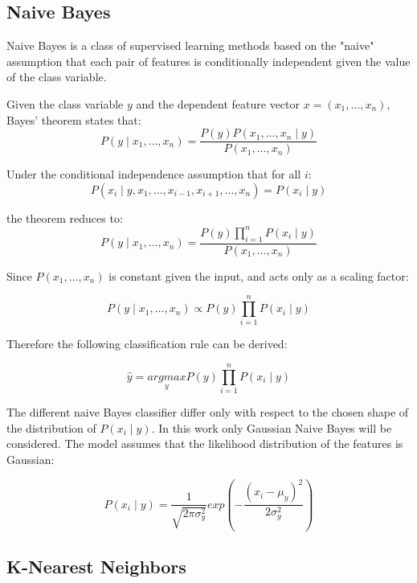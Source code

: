 \documentclass[journal,twocolumn]{IEEEtran}
\begin{document}
\subsection{Naive Bayes}

Naive Bayes is a class of supervised learning methods based on the "naive" assumption that each pair of features is conditionally independent given the value of the class variable.

Given the class variable $y$ and the dependent feature vector $x=(x_1,\dots,x_n)$, Bayes' theorem states that:
\begin{equation}
P(y\mid x_1,\dots, x_n)=\frac{P(y)P(x_1,\dots,x_n\mid y)}{P(x_1,\dots,x_n)}
\end{equation}

Under the conditional independence assumption that for all $i$:
\begin{equation*}
P(x_i\mid y,x_1,\dots,x_{i-1},x_{i+1},\dots, x_n)=P(x_i\mid y)
\end{equation*}

the theorem reduces to:
\begin{equation*}
P(y\mid x_1,\dots, x_n)=\frac{P(y)\prod\limits_{i=1}^nP(x_i\mid y)}{P(x_1,\dots,x_n)}
\end{equation*}

Since $P(x_1,\dots,x_n)$ is constant given the input, and acts only as a scaling factor:

\begin{equation*}
P(y\mid x_1,\dots, x_n)\propto P(y)\prod\limits_{i=1}^nP(x_i\mid y)
\end{equation*}

Therefore the following classification rule can be derived:

\begin{equation*}
\hat y = \underset{y}{argmax}P(y)\prod\limits_{i=1}^nP(x_i\mid y)
\end{equation*}

The different naive Bayes classifier differ only with respect to the chosen shape of the distribution of $P(x_i\mid y)$. In this work only Gaussian Naive Bayes will be considered. The model assumes that the likelihood distribution of the features is Gaussian:

\begin{equation*}
P(x_i\mid y)=\frac{1}{\sqrt{2\pi\sigma_y^2}}exp\left(-\frac{(x_i-\mu_y)^2}{2\sigma_y^2}\right)
\end{equation*}

\subsection{K-Nearest Neighbors}
\end{document}
